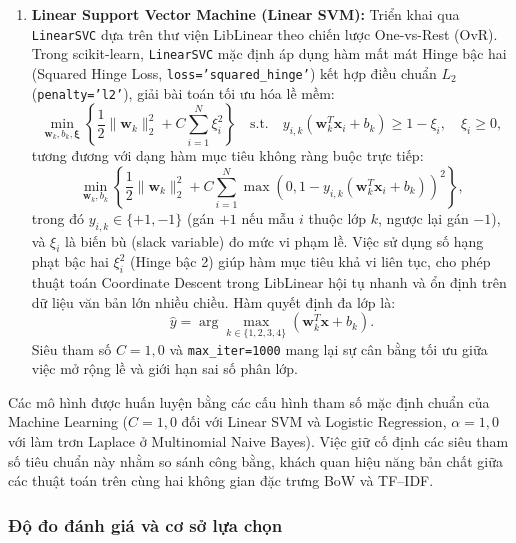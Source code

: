 \documentclass[12pt]{hcmut-report}
\begin{document}
\begin{enumerate}[leftmargin=2em,itemsep=6pt]
  \item \textbf{Linear Support Vector Machine (Linear SVM):} Triển khai qua \texttt{LinearSVC} dựa trên thư viện LibLinear theo chiến lược One-vs-Rest (OvR). Trong scikit-learn, \texttt{LinearSVC} mặc định áp dụng hàm mất mát Hinge bậc hai (Squared Hinge Loss, \texttt{loss='squared\_hinge'}) kết hợp điều chuẩn $L_2$ (\texttt{penalty='l2'}), giải bài toán tối ưu hóa lề mềm:
  \begin{equation}
    \min_{\mathbf{w}_k, b_k, \boldsymbol{\xi}} \left\{ \frac{1}{2} \|\mathbf{w}_k\|_2^2 + C \sum_{i=1}^N \xi_i^2 \right\} \quad \text{s.t.} \quad y_{i,k} (\mathbf{w}_k^T \mathbf{x}_i + b_k) \ge 1 - \xi_i, \quad \xi_i \ge 0,
    \label{eq:svm-obj}
  \end{equation}
  tương đương với dạng hàm mục tiêu không ràng buộc trực tiếp:
  \begin{equation}
    \min_{\mathbf{w}_k, b_k} \left\{ \frac{1}{2} \|\mathbf{w}_k\|_2^2 + C \sum_{i=1}^N \max\left(0, 1 - y_{i,k} (\mathbf{w}_k^T \mathbf{x}_i + b_k)\right)^2 \right\},
    \label{eq:svm-unconstrained}
  \end{equation}
  trong đó $y_{i,k} \in \{+1, -1\}$ (gán $+1$ nếu mẫu $i$ thuộc lớp $k$, ngược lại gán $-1$), và $\xi_i$ là biến bù (slack variable) đo mức vi phạm lề. Việc sử dụng số hạng phạt bậc hai $\xi_i^2$ (Hinge bậc 2) giúp hàm mục tiêu khả vi liên tục, cho phép thuật toán Coordinate Descent trong LibLinear hội tụ nhanh và ổn định trên dữ liệu văn bản lớn nhiều chiều. Hàm quyết định đa lớp là:
  \begin{equation}
    \hat{y} = \arg\max_{k \in \{1,2,3,4\}} (\mathbf{w}_k^T \mathbf{x} + b_k).
    \label{eq:svm-decision}
  \end{equation}
  Siêu tham số $C=1{,}0$ và \texttt{max\_iter=1000} mang lại sự cân bằng tối ưu giữa việc mở rộng lề và giới hạn sai số phân lớp.
\end{enumerate}

Các mô hình được huấn luyện bằng các cấu hình tham số mặc định chuẩn của Machine Learning ($C=1{,}0$ đối với Linear SVM và Logistic Regression, $\alpha=1{,}0$ với làm trơn Laplace ở Multinomial Naive Bayes). Việc giữ cố định các siêu tham số tiêu chuẩn này nhằm so sánh công bằng, khách quan hiệu năng bản chất giữa các thuật toán trên cùng hai không gian đặc trưng BoW và TF--IDF.

\subsubsection{Độ đo đánh giá và cơ sở lựa chọn}
\end{document}
